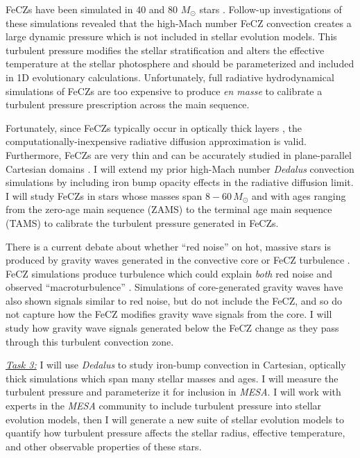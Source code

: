 \documentclass[12pt]{article} %
\begin{document}
FeCZs have been simulated in 40 and 80 $M_{\odot}$ stars \citep{jiang_etal_2015}.
Follow-up investigations of these simulations  \citep{schultz_etal_2020,schultz_etal_2022,schultz_etal_2022b} revealed that the high-Mach number FeCZ convection creates a large dynamic pressure which is not included in stellar evolution models.
This turbulent pressure modifies the stellar stratification and alters the effective temperature at the stellar photosphere and should be parameterized and included in 1D evolutionary calculations.
Unfortunately, full radiative hydrodynamical simulations of FeCZs \citep{jiang_etal_2015} are too expensive to produce \emph{en masse} to calibrate a turbulent pressure prescription across the main sequence.

Fortunately, since FeCZs typically occur in optically thick layers \citep{jermyn_etal_2022_atlas}, the computationally-inexpensive radiative diffusion approximation is valid.
Furthermore, FeCZs are very thin and can be accurately studied in plane-parallel Cartesian domains \citep{jermyn_etal_2022_atlas}.
I will extend my prior high-Mach number \emph{Dedalus} convection simulations \citep{anders_brown_2017} by including iron bump opacity effects in the radiative diffusion limit.
I will study FeCZs in stars whose masses span $8-60\, M_{\odot}$ and with ages ranging from the zero-age main sequence (ZAMS) to the terminal age main sequence (TAMS) to calibrate the turbulent pressure generated in FeCZs.

There is a current debate about whether ``red noise'' on hot, massive stars \citep[Fig.~\ref{fig:intro}, right;][]{bowman_etal_2019} is produced by gravity waves generated in the convective core or FeCZ turbulence \citep{cantiello_etal_2021}.
FeCZ simulations produce turbulence which could explain \emph{both} red noise and observed ``macroturbulence'' \citep{schultz_etal_2022,schultz_etal_2022b}.
Simulations of core-generated gravity waves \citep{edelmann_etal_2019,horst_etal_2020} have also shown signals similar to red noise, but do not include the FeCZ, and so do not capture how the FeCZ modifies gravity wave signals from the core.
I will study how gravity wave signals generated below the FeCZ change as they pass through this turbulent convection zone.
%

\emph{\underline{Task 3:}} I will use \emph{Dedalus} to study iron-bump convection in Cartesian, optically thick simulations which span many stellar masses and ages.
I will measure the turbulent pressure and parameterize it for inclusion in \emph{MESA}.
I will work with experts in the \emph{MESA} community to include turbulent pressure into stellar evolution models, then I will generate a new suite of stellar evolution models to quantify how turbulent pressure affects the stellar radius, effective temperature, and other observable properties of these stars.
\end{document}
